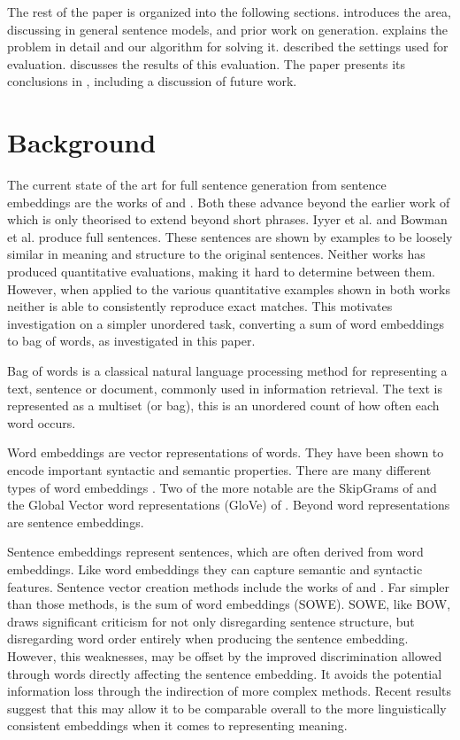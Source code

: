 \documentclass{llncs}
\begin{document}
The rest of the paper is organized into the following sections.  introduces the area, discussing in general sentence models, and prior work on generation.  explains the problem in detail and our algorithm for solving it.  described the settings used for evaluation.  discusses the results of this evaluation. The paper presents its conclusions in , including a discussion of future work.


\section{Background}\label{relwork}

The current state of the art for full sentence generation from sentence embeddings are the works of \cite{iyyer2014generating} and \cite{Bowman2015SmoothGeneration}. Both these advance beyond the earlier work of \cite{Dinu2014CompositionalGeneration} which is only theorised to extend beyond short phrases. Iyyer et al. and Bowman et al. produce full sentences. These sentences are shown by examples to be loosely similar in meaning and structure to the original sentences. Neither works has produced quantitative evaluations, making it hard to determine between them. However, when applied to the various quantitative examples shown in both works neither is able to consistently reproduce exact matches. This motivates investigation on a simpler unordered task, converting a sum of word embeddings to bag of words, as investigated in this paper.

Bag of words is a classical natural language processing method for representing a text, sentence or document, commonly used in information retrieval. The text is represented as a multiset (or bag), this is an unordered count of how often each word occurs.

Word embeddings are vector representations of words. They have been shown to encode important syntactic and semantic properties. There are many different types of word embeddings \parencite{Yin2015}. Two of the more notable are the SkipGrams of \textcite{mikolov2013efficient,mikolov2013linguisticsubstructures} and the Global Vector word representations (GloVe) of \textcite{pennington2014glove}. Beyond word representations are sentence embeddings. 

Sentence embeddings represent sentences, which are often derived from word embeddings. Like word embeddings they can capture semantic and syntactic features. Sentence vector creation methods include the works of \textcite{le2014distributed} and \textcite{socher2014recursive}. Far simpler than those methods, is the  sum of word embeddings (SOWE). SOWE, like BOW, draws significant criticism for not only disregarding sentence structure, but disregarding word order entirely when producing the sentence embedding. However, this weaknesses, may be offset by the improved discrimination allowed through words directly affecting the sentence embedding. It avoids the potential information loss through the indirection of more complex methods. Recent results suggest that this may allow it to be comparable overall to the more linguistically consistent embeddings when it comes to representing meaning. 
\end{document}

